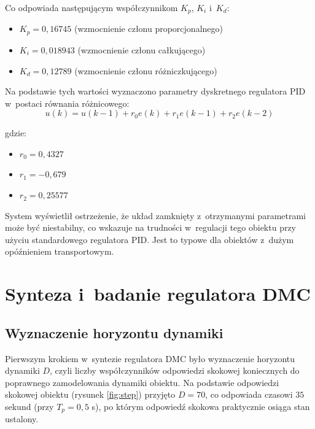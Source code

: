 \documentclass[a4paper,titlepage,11pt,floatssmall]{mwrep}
\begin{document}
Co odpowiada następującym współczynnikom $K_p$, $K_i$ i~$K_d$:
\begin{itemize}
    \item $K_p = 0,16745$ (wzmocnienie członu proporcjonalnego)
    \item $K_i = 0,018943$ (wzmocnienie członu całkującego)
    \item $K_d = 0,12789$ (wzmocnienie członu różniczkującego)
\end{itemize}

Na podstawie tych wartości wyznaczono parametry dyskretnego regulatora PID w~postaci równania różnicowego:
\begin{equation}
    u(k) = u(k-1) + r_0 e(k) + r_1 e(k-1) + r_2 e(k-2)
\end{equation}

gdzie:
\begin{itemize}
    \item $r_0 = 0,4327$
    \item $r_1 = -0,679$
    \item $r_2 = 0,25577$
\end{itemize}

System wyświetlił ostrzeżenie, że układ zamknięty z~otrzymanymi parametrami może być niestabilny, co wskazuje na trudności w~regulacji tego obiektu przy użyciu standardowego regulatora PID. Jest to typowe dla obiektów z~dużym opóźnieniem transportowym.

\section{Synteza i~badanie regulatora DMC}

\subsection{Wyznaczenie horyzontu dynamiki}

Pierwszym krokiem w~syntezie regulatora DMC było wyznaczenie horyzontu dynamiki $D$, czyli liczby współczynników odpowiedzi skokowej koniecznych do poprawnego zamodelowania dynamiki obiektu. Na podstawie odpowiedzi skokowej obiektu (rysunek \ref{fig:step}) przyjęto $D = 70$, co odpowiada czasowi $35$ sekund (przy $T_p = 0,5$ s), po którym odpowiedź skokowa praktycznie osiąga stan ustalony.
\end{document}
